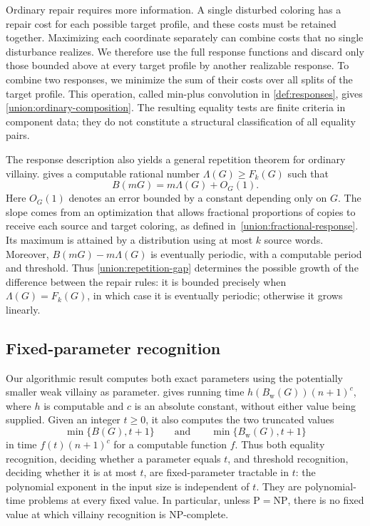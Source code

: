 \documentclass[10pt,a4paper]{amsart}
\numberwithin{equation}{section}
\theoremstyle{definition}
\theoremstyle{remark}
\begin{document}
Ordinary repair requires more information. A single disturbed coloring
has a repair cost for each possible target profile, and these costs
must be retained together. Maximizing each coordinate separately can
combine costs that no single disturbance realizes. We therefore use
the full response functions and discard only those bounded above at
every target profile by another realizable response. To combine two
responses, we minimize the sum of their costs over all splits of the
target profile. This operation, called min-plus convolution in
\cref{def:responses}, gives \cref{union:ordinary-composition}.
The resulting equality tests are finite criteria in component data;
they do not constitute a structural classification of all equality
pairs.

The response description also yields a general repetition theorem
for ordinary villainy.  gives a
computable rational number $\Lambda(G)\ge F_k(G)$ such that
\[
 B(mG)=m\Lambda(G)+O_G(1).
\]
Here $O_G(1)$ denotes an error bounded by a constant depending only on
$G$. The slope comes from an optimization that allows fractional
proportions of copies to receive each source and target coloring,
as defined in~\eqref{union:fractional-response}.
Its maximum is attained by a distribution using at most $k$ source words.
Moreover, $B(mG)-m\Lambda(G)$ is eventually periodic, with a
computable period and threshold. Thus \cref{union:repetition-gap}
determines the possible growth of the difference between the repair
rules: it is bounded precisely when $\Lambda(G)=F_k(G)$, in which
case it is eventually periodic; otherwise it grows linearly.

\subsection{Fixed-parameter recognition}

Our algorithmic result computes both exact parameters using the
potentially smaller weak villainy as parameter. 
gives running time $h(B_{\mathrm w}(G))(n+1)^c$, where $h$ is
computable and $c$ is an absolute constant, without either value being
supplied. Given an integer $t\ge0$, it also computes
the two truncated values
\[
 \min\{B(G),t+1\}\qquad\text{and}\qquad
 \min\{B_{\mathrm w}(G),t+1\}
\]
in time $f(t)(n+1)^c$ for a computable function $f$.
Thus both equality recognition, deciding whether a parameter equals
$t$, and threshold recognition, deciding whether it is at most $t$,
are fixed-parameter tractable in $t$: the polynomial exponent in the
input size is independent of $t$. They are polynomial-time problems
at every fixed value.
In particular,
unless $\mathrm P=\mathrm{NP}$, there is no fixed value at which
villainy recognition is NP-complete.
\end{document}
